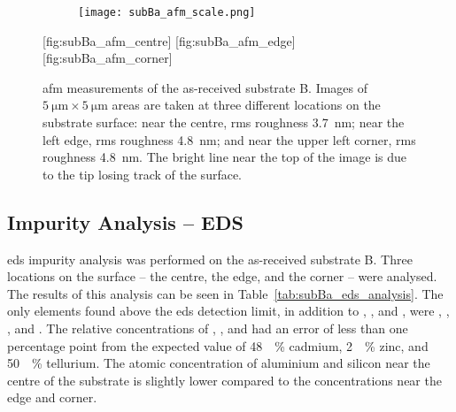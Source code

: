 \begin{figure}[htbp]
    \centering
    \begin{subfigure}[c]{0.032\linewidth}
        \label{fig:subBa_afm_scale}\captionsetup{list=no}
        \texttt{[image: subBa\_afm\_scale.png]}
    \end{subfigure}
    \hfill
    [fig:subBa_afm_centre]
    \hfill
    [fig:subBa_afm_edge]
    \hfill
    [fig:subBa_afm_corner]
    \caption[\Ac{afm} of as-received substrate B.]{\Ac{afm} measurements of the as-received substrate B. Images of $\SI{5}{\micro\metre}\times\SI{5}{\micro\metre}$ areas are taken at three different locations on the substrate surface:  near the centre, \ac{rms} roughness \SI{3,7}{\nano\metre};  near the left edge, \ac{rms} roughness \SI{4,8}{\nano\metre}; and  near the upper left corner, \ac{rms} roughness \SI{4,8}{\nano\metre}. The bright line near the top of the image is due to the tip losing track of the surface.}\label{fig:subBa_afm}
\end{figure} %


\subsection{Impurity Analysis -- EDS}

\Ac{eds} impurity analysis was performed on the as-received substrate B. Three locations on the surface -- the centre, the edge, and the corner -- were analysed. The results of this analysis can be seen in Table~\ref{tab:subBa_eds_analysis}. The only elements found above the \ac{eds} detection limit, in addition to , , and , were , , , and . The relative concentrations of , , and  had an error of less than one percentage point from the expected value of \SI{48}{\atomic\percent} cadmium, \SI{2}{\atomic\percent} zinc, and \SI{50}{\atomic\percent} tellurium. The atomic concentration of aluminium and silicon near the centre of the substrate is slightly lower compared to the concentrations near the edge and corner\todo{}. 

